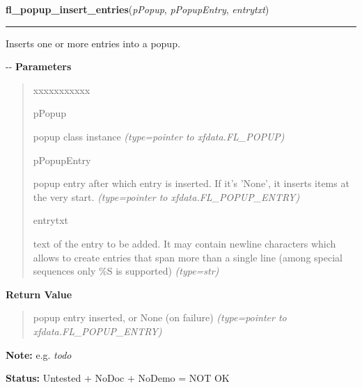     \label{xformslib:flpopup:fl_popup_insert_entries}

    \vspace{0.5ex}

\hspace{.8\funcindent}\begin{boxedminipage}{\funcwidth}

    \raggedright \textbf{fl\_popup\_insert\_entries}(\textit{pPopup}, \textit{pPopupEntry}, \textit{entrytxt})

    \vspace{-1.5ex}

    \rule{\textwidth}{0.5\fboxrule}
\setlength{\parskip}{2ex}

Inserts one or more entries into a popup.

-{}-
\setlength{\parskip}{1ex}
      \textbf{Parameters}
      \vspace{-1ex}

      \begin{quote}
        \begin{Ventry}{xxxxxxxxxxx}

          \item[pPopup]


popup class instance
            {\it (type=pointer to xfdata.FL\_POPUP)}

          \item[pPopupEntry]


popup entry after which entry is inserted. If it's 'None', it inserts
items at the very start.
            {\it (type=pointer to xfdata.FL\_POPUP\_ENTRY)}

          \item[entrytxt]


text of the entry to be added. It may contain newline characters which
allows to create entries that span more than a single line (among
special sequences only \%S is supported)
            {\it (type=str)}

        \end{Ventry}

      \end{quote}

      \textbf{Return Value}
    \vspace{-1ex}

      \begin{quote}

popup entry inserted, or None (on failure)
      {\it (type=pointer to xfdata.FL\_POPUP\_ENTRY)}

      \end{quote}

\textbf{Note:} 
e.g. \emph{todo}


\textbf{Status:} 
Untested + NoDoc + NoDemo = NOT OK


    \end{boxedminipage}

